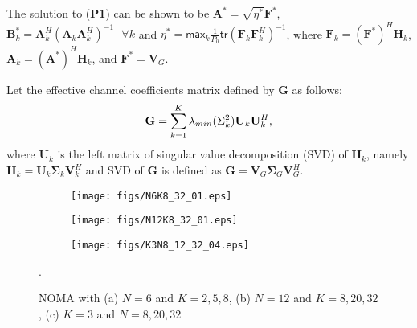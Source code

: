 \documentclass[journal]{IEEEtran}
\theoremstyle{definition}
\begin{document}
 The solution to (\textbf{P1}) can be shown to be $\mathbf{A}^* = \sqrt{\eta^*} \mathbf{F}^*$, $\mathbf{B}_k^* = \mathbf{A}_k^H(\mathbf{A}_k \mathbf{A}_k^H)^{-1} \: \: \: \forall k$ and $\eta^* = \mathsf{max}_k \frac{1}{P_0}\mathsf{tr}(\mathbf{F}_k \mathbf{F}_k^H)^{-1}$, where $\mathbf{F}_k = (\mathbf{F}^*)^H\mathbf{H}_k$, $\mathbf{A}_k = (\mathbf{A}^*)^H\mathbf{H}_k$, and $\mathbf{F}^* = \mathbf{V}_G$\iffalse \footnote{Note $[\mathbf{V}_G]_{:, 1:N}$ denotes the first $N$ columns of the matrix $\mathbf{V}$.}\fi\cite{Huang2018}. 
 
 Let the effective channel coefficients matrix defined by $\mathbf{G}$ as follows: \vspace{-0.1cm}
 \begin{equation} \vspace{-0.1cm}
 \mathbf{G} = \sum_{k =1}^K\lambda_{min}(\Sigma_k^2)\mathbf{U}_k\mathbf{U}_k^H,
 \label{Gmatrix}
 \end{equation} \vspace{-0.1cm}
 \noindent where $\mathbf{U}_k$ is the left matrix of singular value decomposition (SVD) of $\mathbf{H}_k$, namely $\mathbf{H}_k = \mathbf{U}_k \mathbf{\Sigma}_k \mathbf{V}_k^H$ and SVD of $\mathbf{G}$ is defined as $\mathbf{G}  = \mathbf{V}_G \mathbf{\Sigma}_G \mathbf{V}_G^H$.
 

 \begin{figure*}[ht!]
\centering
	\begin{subfigure}{0.30\textwidth}
		\centering
		\texttt{[image: figs/N6K8\_32\_01.eps]}
		\caption{ }
 
	\end{subfigure}
	\begin{subfigure}{0.30\textwidth}
		\centering
		\texttt{[image: figs/N12K8\_32\_01.eps]}
		\caption{ }
	 
	\end{subfigure}
		\begin{subfigure}{0.30\textwidth}
		\centering
		\texttt{[image: figs/K3N8\_12\_32\_04.eps]}
		\caption{ }
		
	\end{subfigure}\vspace{-0.1cm}

	\caption{NOMA with  (a) $N = 6$ and $K = 2, 5, 8$, (b) $N = 12$ and $K = 8, 20, 32$, (c) $K = 3$ and $N = 8, 20, 32$}.
\label{3figs}
\end{figure*}
\end{document}
